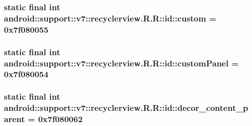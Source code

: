 \hypertarget{classandroid_1_1support_1_1v7_1_1recyclerview_1_1_r_1_1id_082bd92d4eb0c1a2232e9e4c15d22666}{
\subsubsection[{custom}]{\setlength{\rightskip}{0pt plus 5cm}static final int android::support::v7::recyclerview.R.R::id::custom = 0x7f080055}}
\label{classandroid_1_1support_1_1v7_1_1recyclerview_1_1_r_1_1id_082bd92d4eb0c1a2232e9e4c15d22666}


\hypertarget{classandroid_1_1support_1_1v7_1_1recyclerview_1_1_r_1_1id_b50d8de5eacbf8cc9f8a6511389dc7a3}{
\subsubsection[{customPanel}]{\setlength{\rightskip}{0pt plus 5cm}static final int android::support::v7::recyclerview.R.R::id::customPanel = 0x7f080054}}
\label{classandroid_1_1support_1_1v7_1_1recyclerview_1_1_r_1_1id_b50d8de5eacbf8cc9f8a6511389dc7a3}


\hypertarget{classandroid_1_1support_1_1v7_1_1recyclerview_1_1_r_1_1id_70e84775106ff1ffc77a9fcab7736f87}{
\subsubsection[{decor\_\-content\_\-parent}]{\setlength{\rightskip}{0pt plus 5cm}static final int android::support::v7::recyclerview.R.R::id::decor\_\-content\_\-parent = 0x7f080062}}
\label{classandroid_1_1support_1_1v7_1_1recyclerview_1_1_r_1_1id_70e84775106ff1ffc77a9fcab7736f87}


